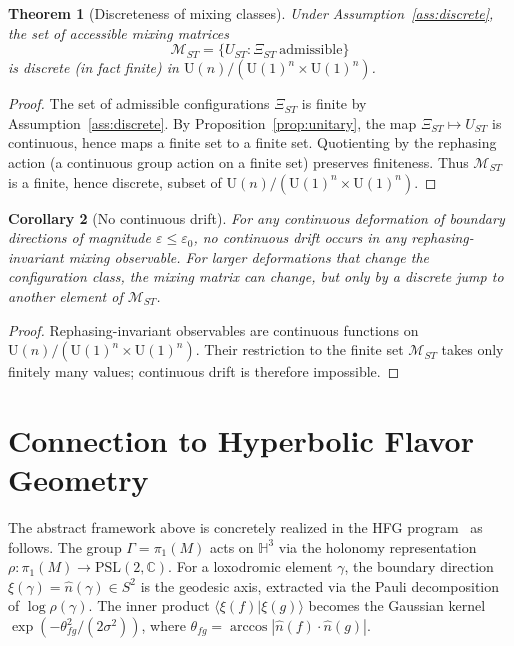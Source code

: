 \documentclass[11pt,a4paper]{article}
\newtheorem{theorem}{Theorem}
\newtheorem{corollary}[theorem]{Corollary}
\theoremstyle{definition}
\theoremstyle{remark}
\begin{document}
\begin{theorem}[Discreteness of mixing classes]
\label{thm:discrete}
Under Assumption~\ref{ass:discrete}, the set of accessible mixing
matrices
\[
  \mathcal{M}_{ST}
  = \{U_{ST} : \Xi_{ST}\ \text{admissible}\}
\]
is discrete (in fact finite) in
$\mathrm{U}(n)/(\mathrm{U}(1)^n\times\mathrm{U}(1)^n)$.
\end{theorem}

\begin{proof}
The set of admissible configurations $\Xi_{ST}$ is finite by
Assumption~\ref{ass:discrete}.
By Proposition~\ref{prop:unitary}, the map $\Xi_{ST}\mapsto U_{ST}$
is continuous, hence maps a finite set to a finite set.
Quotienting by the rephasing action (a continuous group action on a
finite set) preserves finiteness.
Thus $\mathcal{M}_{ST}$ is a finite, hence discrete, subset of
$\mathrm{U}(n)/(\mathrm{U}(1)^n\times\mathrm{U}(1)^n)$.
\end{proof}

\begin{corollary}[No continuous drift]
\label{cor:nodrift}
For any continuous deformation of boundary directions of magnitude
$\varepsilon\leq\varepsilon_0$, no continuous drift occurs in any
rephasing-invariant mixing observable.
For larger deformations that change the configuration class, the
mixing matrix can change, but only by a discrete jump to another
element of $\mathcal{M}_{ST}$.
\end{corollary}

\begin{proof}
Rephasing-invariant observables are continuous functions on
$\mathrm{U}(n)/(\mathrm{U}(1)^n\times\mathrm{U}(1)^n)$.
Their restriction to the finite set $\mathcal{M}_{ST}$ takes only
finitely many values; continuous drift is therefore impossible.
\end{proof}

\section{Connection to Hyperbolic Flavor Geometry}

The abstract framework above is concretely realized in the HFG
program~\cite{Gentry:Unified} as follows.
The group $\Gamma=\pi_1(M)$ acts on $\mathbb{H}^3$ via the
holonomy representation $\rho:\pi_1(M)\to\mathrm{PSL}(2,\mathbb{C})$.
For a loxodromic element $\gamma$, the boundary direction
$\xi(\gamma)=\hat{n}(\gamma)\in S^2$ is the geodesic axis,
extracted via the Pauli decomposition of $\log\rho(\gamma)$.
The inner product $\langle\xi(f)|\xi(g)\rangle$ becomes the
Gaussian kernel $\exp(-\theta_{fg}^2/(2\sigma^2))$, where
$\theta_{fg}=\arccos|\hat{n}(f)\cdot\hat{n}(g)|$.
\end{document}
